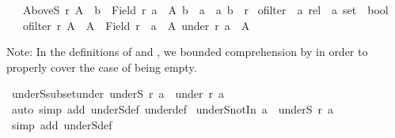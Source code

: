 \begin{isabellebody}
\ \ \ {\isachardoublequoteopen}AboveS\ r\ A\ {\isasymequiv}\ {\isacharbraceleft}{\kern0pt}b\ {\isasymin}\ Field\ r{\isachardot}{\kern0pt}\ {\isasymforall}a\ {\isasymin}\ A{\isachardot}{\kern0pt}\ b\ {\isasymnoteq}\ a\ {\isasymand}\ {\isacharparenleft}{\kern0pt}a{\isacharcomma}{\kern0pt}\ b{\isacharparenright}{\kern0pt}\ {\isasymin}\ r{\isacharbraceright}{\kern0pt}{\isachardoublequoteclose}\isanewline
\isanewline
{}\isamarkupfalse%
\ ofilter\ {\isacharcolon}{\kern0pt}{\isacharcolon}{\kern0pt}\ {\isachardoublequoteopen}{\isacharprime}{\kern0pt}a\ rel\ {\isasymRightarrow}\ {\isacharprime}{\kern0pt}a\ set\ {\isasymRightarrow}\ bool{\isachardoublequoteclose}\isanewline
\ \ \ {\isachardoublequoteopen}ofilter\ r\ A\ {\isasymequiv}\ A\ {\isasymsubseteq}\ Field\ r\ {\isasymand}\ {\isacharparenleft}{\kern0pt}{\isasymforall}a\ {\isasymin}\ A{\isachardot}{\kern0pt}\ under\ r\ a\ {\isasymsubseteq}\ A{\isacharparenright}{\kern0pt}{\isachardoublequoteclose}%
\begin{isamarkuptext}%
Note: In the definitions of  and , we bounded
  comprehension by  in order to properly cover the case of  being
  empty.%
\end{isamarkuptext}\isamarkuptrue%
\isamarkupfalse%
\ underS{\isacharunderscore}{\kern0pt}subset{\isacharunderscore}{\kern0pt}under{\isacharcolon}{\kern0pt}\ {\isachardoublequoteopen}underS\ r\ a\ {\isasymsubseteq}\ under\ r\ a{\isachardoublequoteclose}\isanewline
%
\isadelimproof
\ \ %
\endisadelimproof
%
\isatagproof
{}\isamarkupfalse%
\ {\isacharparenleft}{\kern0pt}auto\ simp\ add{\isacharcolon}{\kern0pt}\ underS{\isacharunderscore}{\kern0pt}def\ under{\isacharunderscore}{\kern0pt}def{\isacharparenright}{\kern0pt}%
\endisatagproof
{\isafoldproof}%
%
\isadelimproof
\isanewline
%
\endisadelimproof
\isanewline
{}\isamarkupfalse%
\ underS{\isacharunderscore}{\kern0pt}notIn{\isacharcolon}{\kern0pt}\ {\isachardoublequoteopen}a\ {\isasymnotin}\ underS\ r\ a{\isachardoublequoteclose}\isanewline
%
\isadelimproof
\ \ %
\endisadelimproof
%
\isatagproof
{}\isamarkupfalse%
\ {\isacharparenleft}{\kern0pt}simp\ add{\isacharcolon}{\kern0pt}\ underS{\isacharunderscore}{\kern0pt}def{\isacharparenright}{\kern0pt}%
\endisatagproof
{\isafoldproof}%
%
\isadelimproof
\isanewline
%
\endisadelimproof
\isanewline
{}\isamarkupfalse%

\end{isabellebody}
